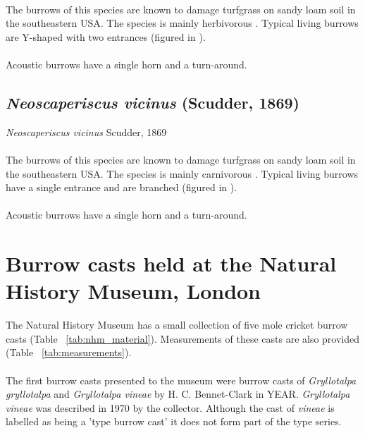 \documentclass{article}
\begin{document}
   \paragraph{}
   The burrows of this species are known to damage turfgrass on sandy loam soil in the  southeastern USA. The species is mainly herbivorous \cite{brandenburg2002}. Typical living  burrows are Y-shaped with two entrances (figured in \cite{brandenburg2002}).
   \paragraph{}
   Acoustic burrows have a single horn and a turn-around.
   
   \subsection{\textit{Neoscaperiscus vicinus} (Scudder, 1869) \cite{scudder1869}}
   \textit{Neoscaperiscus vicinus} Scudder, 1869
   \paragraph{}
   The burrows of this species are known to damage turfgrass on sandy loam soil in the southeastern USA. The species is mainly carnivorous \cite{brandenburg2002}. Typical living burrows have a single entrance and are branched (figured in \cite{brandenburg2002}).
   \paragraph{}
   Acoustic burrows have a single horn and a turn-around.
   
   \section{Burrow casts held at the Natural History Museum, London}
   The Natural History Museum has a small collection of five mole cricket burrow casts (Table ~\ref{tab:nhm_material}). Measurements of these casts are also provided (Table ~\ref{tab:measurements}).
   
   \paragraph{}
   The first burrow casts presented to the museum were burrow casts of \textit{Gryllotalpa gryllotalpa} and \textit{Gryllotalpa vineae} by H. C. Bennet-Clark in YEAR. \textit{Gryllotalpa vineae} was described in 1970 \cite{bennetclark1970b} by the collector. Although the cast of \textit{vineae} is labelled as being a 'type burrow cast' it does not form part of the type series.
   
\end{document}
